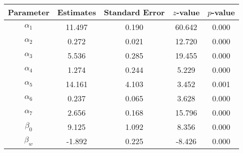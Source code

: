 \begin{table}[ht]
\centering
\begin{tabular}{ccccc}
  \hline
Parameter & Estimates & Standard Error & $z$-value & $p$-value \\ 
  \hline
$\alpha_1$ & 11.497 & 0.190 & 60.642 & 0.000 \\ 
  $\alpha_2$ & 0.272 & 0.021 & 12.720 & 0.000 \\ 
  $\alpha_3$ & 5.536 & 0.285 & 19.455 & 0.000 \\ 
  $\alpha_4$ & 1.274 & 0.244 & 5.229 & 0.000 \\ 
  $\alpha_5$ & 14.161 & 4.103 & 3.452 & 0.001 \\ 
  $\alpha_6$ & 0.237 & 0.065 & 3.628 & 0.000 \\ 
  $\alpha_7$ & 2.656 & 0.168 & 15.796 & 0.000 \\ 
  $\beta_0$ & 9.125 & 1.092 & 8.356 & 0.000 \\ 
  $\beta_w$ & -1.892 & 0.225 & -8.426 & 0.000 \\ 
   \hline
\end{tabular}
\end{table}
